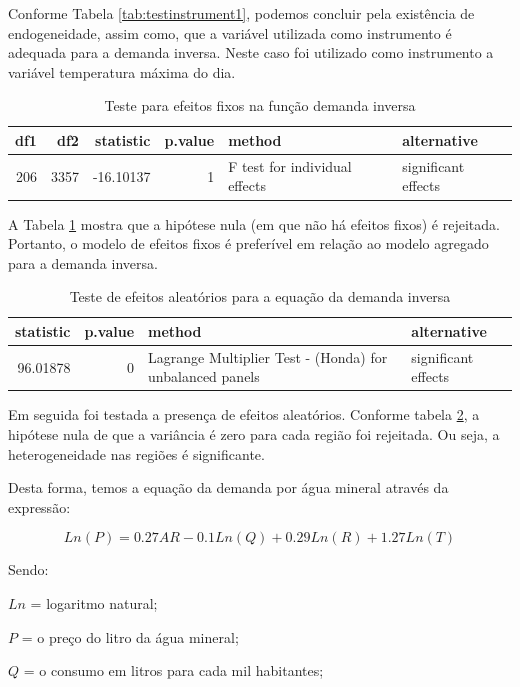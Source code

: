 \documentclass[
  12pt,
]{book}
\begin{document}
Conforme Tabela \ref{tab:testinstrument1}, podemos concluir pela existência de endogeneidade, assim como, que a variável utilizada como instrumento é adequada para a demanda inversa. Neste caso foi utilizado como instrumento a variável temperatura máxima do dia.

\begin{table}

\caption{\label{tab:testf1}Teste para efeitos fixos na função demanda inversa}
\centering
\begin{tabular}[t]{r|r|r|r|l|l}
\hline
df1 & df2 & statistic & p.value & method & alternative\\
\hline
206 & 3357 & -16.10137 & 1 & F test for individual effects & significant effects\\
\hline
\end{tabular}
\end{table}

A Tabela \ref{tab:testf1} mostra que a hipótese nula (em que não há efeitos fixos) é rejeitada. Portanto, o modelo de efeitos fixos é preferível em relação ao modelo agregado para a demanda inversa.

\begin{table}

\caption{\label{tab:randomt1}Teste de efeitos aleatórios para a equação da demanda inversa}
\centering
\begin{tabular}[t]{r|r|l|l}
\hline
statistic & p.value & method & alternative\\
\hline
96.01878 & 0 & Lagrange Multiplier Test -  (Honda) for unbalanced panels & significant effects\\
\hline
\end{tabular}
\end{table}

\newpage

Em seguida foi testada a presença de efeitos aleatórios. Conforme tabela \ref{tab:randomt1}, a hipótese nula de que a variância é zero para cada região foi rejeitada. Ou seja, a heterogeneidade nas regiões é significante.

Desta forma, temos a equação da demanda por água mineral através da expressão:

\[ Ln(P) = 0.27AR - 0.1Ln(Q) + 0.29Ln(R) + 1.27Ln(T)\]

Sendo:

\(Ln\) = logaritmo natural;

\(P\) = o preço do litro da água mineral;

\(Q\) = o consumo em litros para cada mil habitantes;
\end{document}
